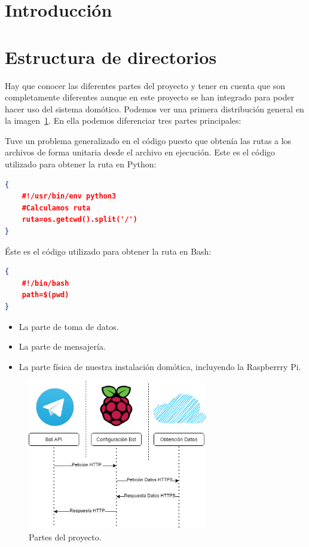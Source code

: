 
\section{Introducción}

\section{Estructura de directorios}
Hay que conocer las diferentes partes del proyecto y tener en cuenta que son completamente diferentes aunque en este proyecto se han integrado para poder hacer uso del sistema domótico. Podemos ver una primera distribución general en la imagen~\ref{Img:PartesProyecto}. En ella podemos diferenciar tres partes principales:

Tuve un problema generalizado en el código puesto que obtenía las rutas a los archivos de forma unitaria desde el archivo en ejecución. Este es el código utilizado para obtener la ruta en Python:
\begin{lstlisting}[language=json,firstnumber=0]
{
    #!/usr/bin/env python3
    #Calculamos ruta
    ruta=os.getcwd().split('/')
}
\end{lstlisting}

Éste es el código utilizado para obtener la ruta en Bash:
\begin{lstlisting}[language=json,firstnumber=0]
{
    #!/bin/bash
    path=$(pwd)
}
\end{lstlisting}

\begin{itemize}
    \item La parte de toma de datos.
    \item La parte de mensajería.
    \item La parte física de nuestra instalación domótica, incluyendo la Raspberrry Pi.
\end{itemize}

\begin{figure}
    \centering
    \includegraphics[width=0.7\textwidth]{img/PartesProyecto.png}
    \caption{Partes del proyecto. } \label{Img:PartesProyecto}
\end{figure}

